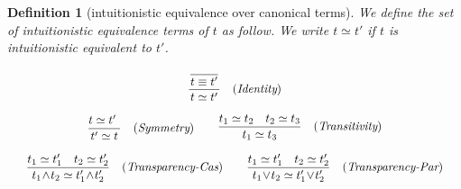 \documentclass[12pt]{article}
\newtheorem{Definition}{Definition}[section]
\begin{document}
\begin{Definition}[intuitionistic equivalence over canonical terms]
  \label{equality_on_CANONICALS}
  We define the set of intuitionistic equivalence terms of $t$ as follow.
  We write $t \simeq t'$ if $t$ is intuitionistic equivalent to $t'$.
  
  \begin{displaymath}
    \begin{array}{c}

      \begin{array}{rl}
        \dfrac{
          \dfrac{}{
            \raisebox{0.5ex}[2.3ex][0ex]{$t \equiv t'$}
          }
        }{
          t \simeq t'
        }  &  (\text{\it Identity})
      \end{array}  \\
      \\
        
      \begin{array}{rl}
        \begin{array}{rl}
          \dfrac{
            t \simeq t'\
          }{
            t' \simeq t
          }  &  (\text{\it Symmetry})
        \end{array}
        
        & \begin{array}{rl}
            \dfrac{t_1 \simeq t_2 \quad t_2 \simeq t_3}{
              t_1 \simeq t_3
            }  &  (\text{\it Transitivity})
          \end{array}
      \end{array}  \\
      \\
      
      \begin{array}{ll}
        \begin{array}{rl}
          \dfrac{t_1 \simeq t'_1 \quad t_2 \simeq t'_2}{
            t_1 \!\wedge\! t_2 \simeq t'_1 \!\wedge\! t'_2
          }  &  (\text{\it Transparency-Cas})
        \end{array}
        
        & \begin{array}{rl}
            \dfrac{t_1 \simeq t'_1 \quad t_2 \simeq t'_2}{
              t_1 \!\vee\! t_2 \simeq t'_1 \!\vee\! t'_2
            }  &  (\text{\it Transparency-Par})
          \end{array}
      \end{array}  \\
      \\


\end{array}
\end{displaymath}
\end{Definition}
\end{document}
